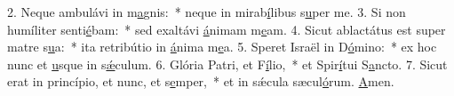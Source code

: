 2. Neque ambulávi in m\uline{a}gnis:~* neque in mirab\uline{í}libus s\uline{u}per me.
3. Si non humíliter senti\uline{é}bam:~* sed exaltávi \uline{á}nimam m\uline{e}am.
4. Sicut ablactátus est super matre s\uline{u}a:~* ita retribútio in \uline{á}nima m\uline{e}a.
5. Speret Israël in D\uline{ó}mino:~* ex hoc nunc et \uline{u}sque in s\uline{ǽ}culum.
6. Glória Patri, et F\uline{í}lio,~* et Spir\uline{í}tui S\uline{a}ncto.
7. Sicut erat in princípio, et nunc, et s\uline{e}mper,~* et in sǽcula sæcul\uline{ó}rum. \uline{A}men.
